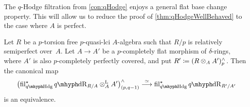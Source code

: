 \documentclass[DIV=12,numbers=enddot,leqno,bibliography=totoc]{scrartcl}
\begin{document}
	The $q$-Hodge filtration from \cref{con:qHodge} enjoys a general flat base change property. This will allow us to reduce the proof of \cref{thm:qHodgeWellBehaved} to the case where $A$ is perfect.
	
	\begin{lem}\label{lem:qHodgeBaseChange}
		Let $R$ be a $p$-torsion free $p$-quasi-lci $A$-algebra such that $R/p$ is relatively semiperfect over~$A$. Let $A\rightarrow A'$ be a $p$-completely flat morphism of $\delta$-rings, where $A'$ is also $p$-completely perfectly covered, and put $R'\coloneqq (R\otimes_AA')_p^\complete$. Then the canonical map
		\begin{equation*}
			\bigl(\fil_{\qHodge}^\star\qdeRham_{R/A}\lotimes_{A}A'\bigr)_{(p,q-1)}^\complete \overset{\simeq}{\longrightarrow} \fil_{\qHodge}^\star\qdeRham_{R'/A'}
		\end{equation*}
		is an equivalence.
	\end{lem}
\end{document}
